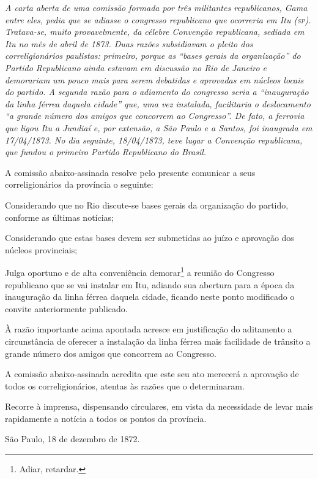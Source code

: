 \begin{didascalia}
\emph{A carta aberta de uma comissão formada por três militantes
republicanos, Gama entre eles, pedia que se adiasse o congresso
republicano que ocorreria em Itu (\textsc{sp}). Tratava-se, muito provavelmente,
da célebre Convenção republicana, sediada em Itu no mês de abril de
1873. Duas razões subsidiavam o pleito dos correligionários paulistas:
primeiro, porque as ``bases gerais da organização'' do Partido Republicano
ainda estavam em discussão no Rio de Janeiro e demorariam um pouco mais
para serem debatidas e aprovadas em núcleos locais do partido. A segunda
razão para o adiamento do congresso seria a ``inauguração da linha férrea
daquela cidade'' que, uma vez instalada, facilitaria o deslocamento ``a
grande número dos amigos que concorrem ao Congresso''. De fato, a
ferrovia que ligou Itu a Jundiaí e, por extensão, a São Paulo e a
Santos, foi inaugrada em 17/04/1873. No dia seguinte, 18/04/1873, teve
lugar a Convenção republicana, que fundou o primeiro Partido Republicano
do Brasil.}
\end{didascalia}


A comissão abaixo-assinada resolve pelo presente comunicar a seus
correligionários da província o seguinte:

Considerando que no Rio discute-se bases gerais da organização do
partido, conforme as últimas notícias;

Considerando que estas bases devem ser submetidas ao juízo e aprovação
dos núcleos provinciais;

Julga oportuno e de alta conveniência demorar\footnote{ Adiar,
  retardar.} a reunião do Congresso republicano que se vai instalar em
Itu, adiando sua abertura para a época da inauguração da linha férrea
daquela cidade, ficando neste ponto modificado o convite anteriormente
publicado.

À razão importante acima apontada acresce em justificação do aditamento
a circunstância de oferecer a instalação da linha férrea mais facilidade
de trânsito a grande número dos amigos que concorrem ao Congresso.

A comissão abaixo-assinada acredita que este seu ato merecerá a
aprovação de todos os correligionários, atentas às razões que o
determinaram.

Recorre à imprensa, dispensando circulares, em vista da necessidade de
levar mais rapidamente a notícia a todos os pontos da província.

São Paulo, 18 de dezembro de 1872.

